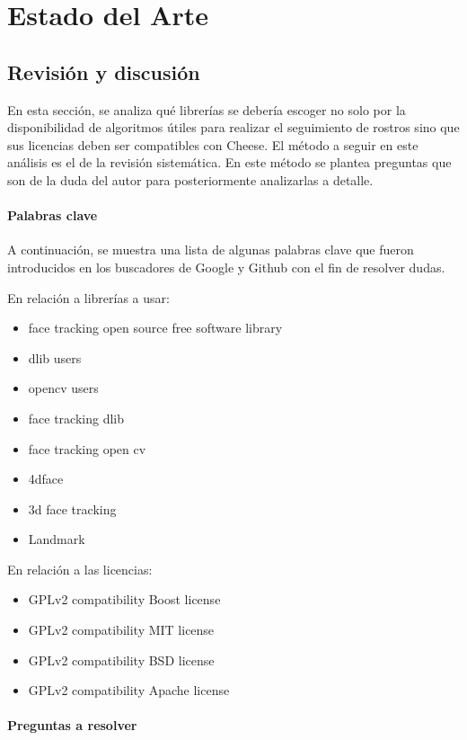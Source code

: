 \documentclass[a4paper,openright,12pt]{report}
\begin{document}
\chapter{Estado del Arte}
\section{Revisión y discusión}

En esta sección, se analiza qué librerías se debería escoger no solo por la
disponibilidad de algoritmos útiles para realizar el seguimiento de rostros sino
que sus licencias deben ser compatibles con Cheese. El método a seguir en este
análisis es el de la revisión sistemática. En este método se plantea preguntas
que son de la duda del autor para posteriormente analizarlas a detalle.\\

\subsubsection{Palabras clave}
A continuación, se muestra una lista de algunas palabras clave que fueron
introducidos en los buscadores de Google y Github con el fin de resolver dudas.

En relación a librerías a usar:

\begin{itemize}
	\item face tracking open source free software library
	\item dlib users
	\item opencv users
	\item face tracking dlib
	\item face tracking open cv
	\item 4dface
	\item 3d face tracking
	\item Landmark
\end{itemize}

En relación a las licencias:
\begin{itemize}
	\item GPLv2 compatibility Boost license
	\item GPLv2 compatibility MIT license
	\item GPLv2 compatibility BSD license
	\item GPLv2 compatibility Apache license
\end{itemize}

\subsubsection{Preguntas a resolver}
\end{document}
